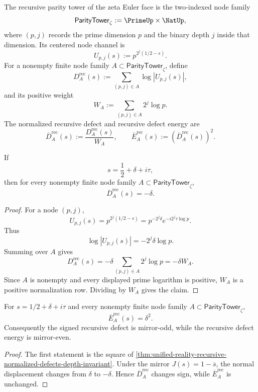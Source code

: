 \begin{definition}
\label{def:unified-reality-recursive-parity-tower}
The recursive parity tower of the zeta Euler face is the two-indexed
node family
$$
\mathsf{ParityTower}_{\zeta}:=\PrimeUp\times\NatUp,
$$
where $(p,j)$ records the prime dimension $p$ and the binary depth $j$
inside that dimension.  Its centered node channel is
$$
U_{p,j}(s):=p^{2^j(1/2-s)}.
$$
For a nonempty finite node family
$A\subset\mathsf{ParityTower}_{\zeta}$, define
$$
D_A^{\mathrm{rec}}(s)
:=
\sum_{(p,j)\in A}\log |U_{p,j}(s)|,
$$
and its positive weight
$$
W_A
:=
\sum_{(p,j)\in A}2^j\log p.
$$
The normalized recursive defect and recursive defect energy are
$$
\overline D_A^{\mathrm{rec}}(s)
:=
\frac{D_A^{\mathrm{rec}}(s)}{W_A},
\qquad
\overline E_A^{\mathrm{rec}}(s)
:=
\left(\overline D_A^{\mathrm{rec}}(s)\right)^2.
$$
\end{definition}

\begin{theorem}
\label{thm:unified-reality-recursive-normalized-defects-depth-invariant}
If
$$
s=\frac12+\delta+i\tau,
$$
then for every nonempty finite node family
$A\subset\mathsf{ParityTower}_{\zeta}$,
$$
\overline D_A^{\mathrm{rec}}(s)=-\delta.
$$
\end{theorem}

\begin{proof}
For a node $(p,j)$,
$$
U_{p,j}(s)
=
p^{2^j(1/2-s)}
=
p^{-2^j\delta}e^{-i2^j\tau\log p}.
$$
Thus
$$
\log |U_{p,j}(s)|=-2^j\delta\log p.
$$
Summing over $A$ gives
$$
D_A^{\mathrm{rec}}(s)
=
-\delta\sum_{(p,j)\in A}2^j\log p
=
-\delta W_A.
$$
Since $A$ is nonempty and every displayed prime logarithm is positive,
$W_A$ is a positive normalization row.  Dividing by $W_A$ gives the
claim.
\end{proof}

\begin{corollary}
\label{cor:unified-reality-recursive-defect-energy-depth-invariant}
For $s=1/2+\delta+i\tau$ and every nonempty finite node family
$A\subset\mathsf{ParityTower}_{\zeta}$,
$$
\overline E_A^{\mathrm{rec}}(s)=\delta^2.
$$
Consequently the signed recursive defect is mirror-odd, while the
recursive defect energy is mirror-even.
\end{corollary}

\begin{proof}
The first statement is the square of
\autoref{thm:unified-reality-recursive-normalized-defects-depth-invariant}.
Under the mirror $J(s)=1-\overline{s}$, the normal displacement changes
from $\delta$ to $-\delta$.  Hence
$\overline D_A^{\mathrm{rec}}$ changes sign, while
$\overline E_A^{\mathrm{rec}}$ is unchanged.
\end{proof}

